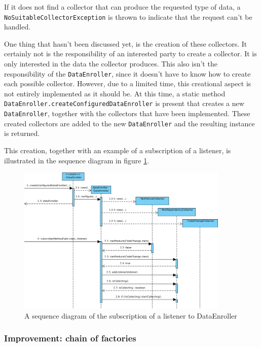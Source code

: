 \documentclass[i2]{oss}
\newcommand{\class}[1]{\texttt{#1}}
\newcommand{\method}[1]{\texttt{#1}}
\begin{document}
If it does not find a collector that can produce the requested type of data, a \class{NoSuitableCollectorException} is thrown to indicate that the request can't be handled.

One thing that hasn't been discussed yet, is the creation of these collectors.
It certainly not is the responsibility of an interested party to create a collector. 
It is only interested in the data the collector produces.
This also isn't the responsibility of the \class{DataEnroller}, since it doesn't have to know how to create each possible collector.
However, due to a limited time, this creational aspect is not entirely implemented as it should be.
At this time, a static method \method{DataEnroller.createConfiguredDataEnroller} is present that creates a new \class{DataEnroller}, together with the collectors that have been implemented.
These created collectors are added to the new \class{DataEnroller} and the resulting instance is returned.

This creation, together with an example of a subscription of a listener, is illustrated in the sequence diagram in figure \ref{fig:sequence:subscribe-collector-listener}.

\begin{figure}[tbp]
\begin{center}
    \includegraphics[width=0.9\textwidth]{SubscribeToDataCollector}
    \caption{A sequence diagram of the subscription of a listener to DataEnroller}
	\label{fig:sequence:subscribe-collector-listener}
\end{center}
\end{figure}

\subsubsection{Improvement: chain of factories}
\end{document}
